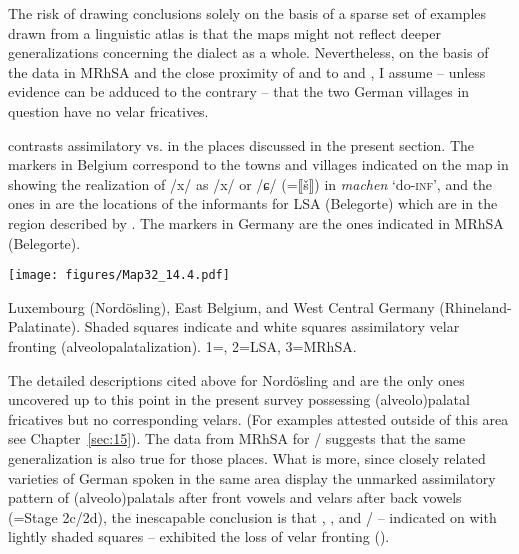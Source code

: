 The risk of drawing conclusions solely on the basis of a sparse set of examples drawn from a linguistic atlas is that the maps might not reflect deeper generalizations concerning the dialect as a whole. Nevertheless, on the basis of the data in MRhSA and the close proximity of  and  to  and , I assume -- unless evidence can be adduced to the contrary -- that the two German villages in question have no velar fricatives.

 contrasts assimilatory vs.  in the places discussed in the present section. The markers in Belgium correspond to the towns and villages indicated on the map in \citet[146]{Hecker1972} showing the realization of /x/ as /x/ or /ɕ/ (=⟦š⟧) in \textit{machen} ‘do-\textsc{inf}’, and the ones in  are the locations of the informants for LSA (Belegorte) which are in the  region described by \citet{Bruch1952}. The markers in Germany are the ones indicated in MRhSA (Belegorte).

\begin{map}
\texttt{[image: figures/Map32\_14.4.pdf]}
\caption[{Luxembourg} ({Nordösling}),  {East Belgium}, and West Central Germany (Rhineland-Palatinate)]{{Luxembourg} ({Nordösling}), {East Belgium}, and West Central Germany (Rhineland-Palatinate). Shaded squares indicate  and white squares assimilatory velar fronting (alveolopalatalization). 1=\citet{Hecker1972}, 2=LSA, 3=MRhSA.}
\label{map:32}
\end{map}

The detailed descriptions cited above for {Nordösling} and  are the only ones uncovered up to this point in the present survey possessing (alveolo)palatal fricatives but no corresponding velars. (For examples attested outside of this area see Chapter~\ref{sec:15}). The data from MRhSA for / suggests that the same generalization is also true for those places. What is more, since closely related varieties of German spoken in the same area display the unmarked assimilatory pattern of (alveolo)palatals after front vowels and velars after back vowels (=Stage 2c/2d), the inescapable conclusion is that , , and / -- indicated on  with lightly shaded squares -- exhibited the loss of velar fronting ().

